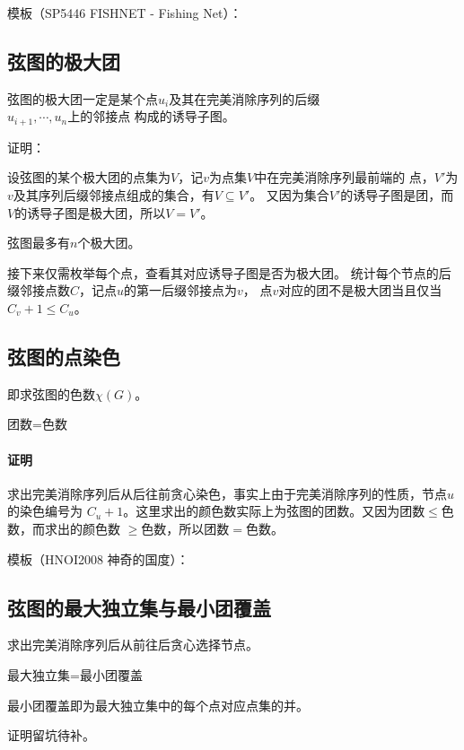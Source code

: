 模板（SP5446 FISHNET - Fishing Net）：

\subsection{弦图的极大团}
\begin{theorem}
弦图的极大团一定是某个点$u_i$及其在完美消除序列的后缀\\${u_{i+1},\cdots,u_n}$上的邻接点
构成的诱导子图。
\end{theorem}
证明：

设弦图的某个极大团的点集为$V$，记$v$为点集$V$中在完美消除序列最前端的
点，$V'$为$v$及其序列后缀邻接点组成的集合，有$V\subseteq V'$。
又因为集合$V'$的诱导子图是团，而$V$的诱导子图是极大团，所以$V=V'$。
\begin{inference}
    弦图最多有$n$个极大团。
\end{inference}

接下来仅需枚举每个点，查看其对应诱导子图是否为极大团。
统计每个节点的后缀邻接点数$C$，记点$u$的第一后缀邻接点为$v$，
点$v$对应的团不是极大团当且仅当$C_v+1\leq C_u$。
\subsection{弦图的点染色}
即求弦图的色数$\chi(G)$。

\begin{theorem}
    团数=色数
\end{theorem}

\paragraph{证明}
求出完美消除序列后从后往前贪心染色，事实上由于完美消除序列的性质，节点$u$的染色编号为
$C_u+1$。这里求出的颜色数实际上为弦图的团数。又因为团数$\leq$色数，而求出的颜色数
$\geq$色数，所以团数$=$色数。

模板（HNOI2008 神奇的国度）：

\subsection{弦图的最大独立集与最小团覆盖}
求出完美消除序列后从前往后贪心选择节点。

\begin{theorem}
    最大独立集=最小团覆盖
\end{theorem}

最小团覆盖即为最大独立集中的每个点对应点集的并。

证明留坑待补。
